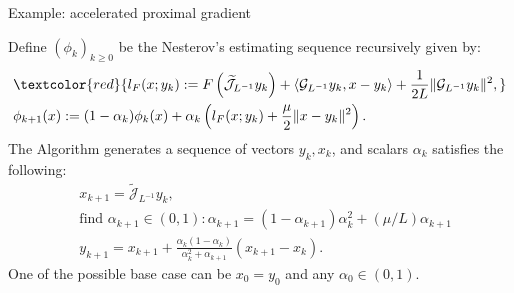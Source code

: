 \documentclass[11pt]{beamer}
\begin{document}
        \begin{frame}{Example: accelerated proximal gradient}
            \begin{definition}
                \label{def:nes-est-seq-pg}
                {\small
                    Define $(\phi_k)_{k \ge0}$ be the Nesterov's estimating sequence recursively given by: 
                    \begin{align*}
                        &\textcolor{red}{
                            l_F(x; y_k) := 
                            F\left(\widetilde{\mathcal J}_{L^{-1}} y_k \right) 
                            + \langle \mathcal G_{L^{-1}}y_k, x - y_k\rangle + 
                            \frac{1}{2L}\Vert \mathcal G_{L^{-1}}y_k\Vert^2,
                        } 
                        \\
                        & 
                        \phi_{k + 1}(x)
                        := (1 - \alpha_k)\phi_k (x) + 
                        \alpha_k 
                        \left(
                            l_F(x; y_k) + \frac{\mu}{2}\Vert x - y_k\Vert^2
                        \right). 
                    \end{align*}
                    The Algorithm generates a sequence of vectors $y_k, x_k$, and scalars $\alpha_k$ satisfies the following: 
                    \begin{align*}
                        &x_{k + 1} = \widetilde{\mathcal J}_{L^{-1}} y_k, 
                        \\
                        & \text{find } \alpha_{k + 1} \in (0, 1): 
                        \alpha_{k + 1} = (1 - \alpha_{k + 1})\alpha_k^{2} + (\mu/L) \alpha_{k + 1}
                        \\
                        &y_{k + 1} = x_{k + 1} + \frac{\alpha_k(1 - \alpha_k)}{\alpha_k^2 + \alpha_{k + 1}}(x_{k + 1} - x_k). 
                    \end{align*}
                    One of the possible base case can be $x_0 = y_0$ and any $\alpha_0 \in (0, 1)$. 
                }
            \end{definition}
                
        \end{frame}
\end{document}
